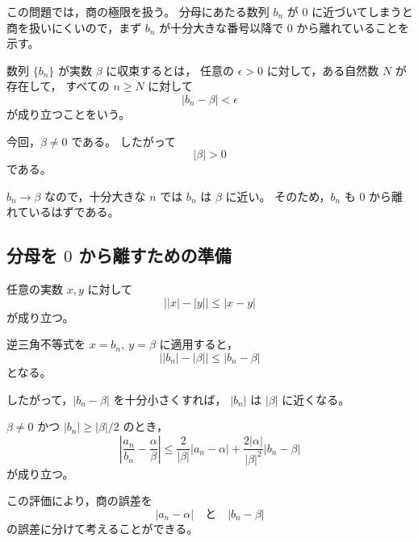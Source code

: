 \begin{background}
	この問題では，商の極限を扱う。
	分母にあたる数列 $b_n$ が $0$ に近づいてしまうと
	商を扱いにくいので，まず $b_n$ が十分大きな番号以降で
	$0$ から離れていることを示す。

	\begin{definition}[数列の収束]
		数列 $\{b_n\}$ が実数 $\beta$ に収束するとは，
		任意の $\epsilon>0$ に対して，ある自然数 $N$ が存在して，
		すべての $n\geq N$ に対して
		\[
			|b_n-\beta|<\epsilon
		\]
		が成り立つことをいう。
	\end{definition}

	\begin{remark}
		今回，$\beta\neq 0$ である。
		したがって
		\[
			|\beta|>0
		\]
		である。

		$b_n\to\beta$ なので，十分大きな $n$ では
		$b_n$ は $\beta$ に近い。
		そのため，$b_n$ も $0$ から離れているはずである。
	\end{remark}

	\subsection{分母を $0$ から離すための準備}

	\begin{lemma}[逆三角不等式]
		任意の実数 $x,y$ に対して
		\[
			\bigl||x|-|y|\bigr|\leq |x-y|
		\]
		が成り立つ。
	\end{lemma}

	\begin{remark}
		逆三角不等式を $x=b_n,\ y=\beta$ に適用すると，
		\[
			\bigl||b_n|-|\beta|\bigr|
			\leq |b_n-\beta|
		\]
		となる。

		したがって，$|b_n-\beta|$ を十分小さくすれば，
		$|b_n|$ は $|\beta|$ に近くなる。
	\end{remark}

	\begin{lemma}[商の誤差評価]
		$\beta\neq 0$ かつ $|b_n|\geq |\beta|/2$ のとき，
		\[
			\left|
				\frac{a_n}{b_n}
				-
				\frac{\alpha}{\beta}
			\right|
			\leq
			\frac{2}{|\beta|}|a_n-\alpha|
			+
			\frac{2|\alpha|}{|\beta|^2}|b_n-\beta|
		\]
		が成り立つ。
	\end{lemma}

	\begin{remark}
		この評価により，商の誤差を
		\[
			|a_n-\alpha|
			\quad\text{と}\quad
			|b_n-\beta|
		\]
		の誤差に分けて考えることができる。
	\end{remark}
\end{background}
